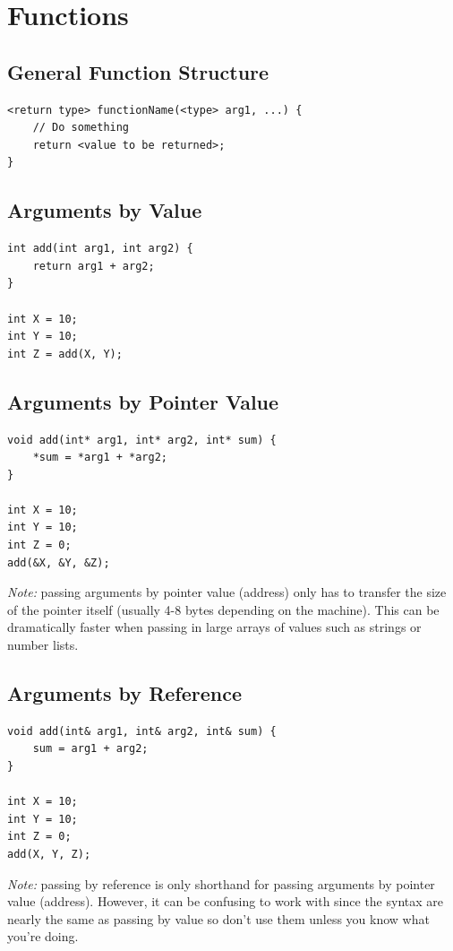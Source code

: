\documentclass{article}
\begin{document}
\section{Functions}

\subsection{General Function Structure}
\begin{lstlisting}
<return type> functionName(<type> arg1, ...) {
	// Do something
	return <value to be returned>;
}
\end{lstlisting}

\subsection{Arguments by Value}
\begin{lstlisting}
int add(int arg1, int arg2) {
	return arg1 + arg2;
}

int X = 10;
int Y = 10;
int Z = add(X, Y);
\end{lstlisting}

\subsection{Arguments by Pointer Value}
\begin{lstlisting}
void add(int* arg1, int* arg2, int* sum) {
	*sum = *arg1 + *arg2;
}

int X = 10;
int Y = 10;
int Z = 0;
add(&X, &Y, &Z);
\end{lstlisting}
\emph{Note:} passing arguments by pointer value (address) only has to transfer the size of the pointer itself (usually 4-8 bytes depending on the machine). This can be dramatically faster when passing in large arrays of values such as strings or number lists. 

\subsection{Arguments by Reference}
\begin{lstlisting}
void add(int& arg1, int& arg2, int& sum) {
	sum = arg1 + arg2;
}

int X = 10;
int Y = 10;
int Z = 0;
add(X, Y, Z);
\end{lstlisting}

\emph{Note:} passing by reference is only shorthand for passing arguments by pointer value (address). However, it can be confusing to work with since the syntax are nearly the same as passing by value so don't use them unless you know what you're doing.
\end{document}
